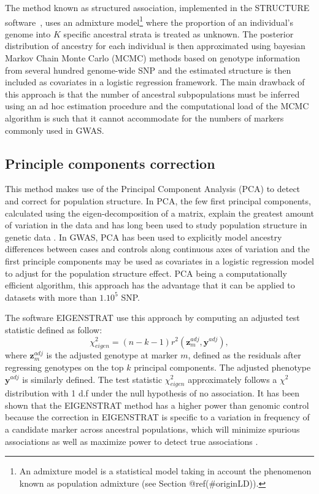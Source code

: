 \documentclass[]{book}
\begin{document}
The method known as structured association, implemented in the STRUCTURE
software~\citep{pritchard2000inference}, uses an admixture model\footnote{An admixture model is a statistical model taking in account the
  phenomenon known as population admixture (see Section
  @ref(\#originLD)).} where
the proportion of an individual's genome into \(K\) specific ancestral
strata is treated as unknown. The posterior distribution of ancestry for
each individual is then approximated using bayesian Markov Chain Monte
Carlo (MCMC) methods based on genotype information from several hundred
genome-wide SNP and the estimated structure is then included as
covariates in a logistic regression framework. The main drawback of this
approach is that the number of ancestral subpopulations must be inferred
using an ad hoc estimation procedure and the computational load of the
MCMC algorithm is such that it cannot accommodate for the numbers of
markers commonly used in GWAS.

\hypertarget{PCC}{%
\subsection{Principle components correction}\label{PCC}}

This method makes use of the Principal Component Analysis (PCA) to
detect and correct for population structure. In PCA, the few first
principal components, calculated using the eigen-decomposition of a
matrix, explain the greatest amount of variation in the data and has
long been used to study population structure in genetic data
\citep{reich2008principal}. In GWAS, PCA has been used to explicitly model
ancestry differences between cases and controls along continuous axes of
variation and the first principle components may be used as covariates
in a logistic regression model to adjust for the population structure
effect. PCA being a computationally efficient algorithm, this approach
has the advantage that it can be applied to datasets with more than
\(1.10^5\) SNP.

The software EIGENSTRAT \citep{price_principal_2006} use this approach by
computing an adjusted test statistic defined as follow:
\[\chi^2_{eigen} = (n-k-1) r^2(\mathbf{z}_m^{adj},\mathbf{y}^{adj}),\] where
\(\mathbf{z}_m^{adj}\) is the adjusted genotype at marker \(m\), defined as the
residuals after regressing genotypes on the top \(k\) principal
components. The adjusted phenotype \(\mathbf{y}^{adj}\) is similarly defined. The
test statistic \(\chi^2_{eigen}\) approximately follows a \(\chi^2\)
distribution with 1 d.f under the null hypothesis of no association. It
has been shown that the EIGENSTRAT method has a higher power than
genomic control because the correction in EIGENSTRAT is specific to a
variation in frequency of a candidate marker across ancestral
populations, which will minimize spurious associations as well as
maximize power to detect true associations \citep{price_principal_2006} .
\end{document}

